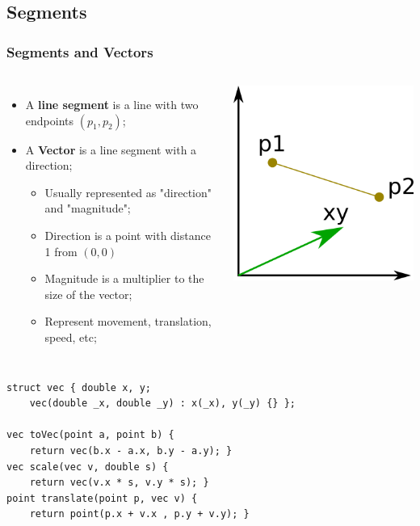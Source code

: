 \subsection{Segments}
\begin{frame}[fragile]
  \frametitle{Segments and Vectors}
    \begin{columns}
      \begin{itemize}
        \item A {\bf line segment} is a line with two endpoints $(p_1, p_2)$;
        \item A {\bf Vector} is a line segment with a direction;
        \begin{itemize}
          \item Usually represented as "direction" and "magnitude";
          \item Direction is a point with distance 1 from $(0,0)$
          \item Magnitude is a multiplier to the size of the vector;
          \item Represent movement, translation, speed, etc;
        \end{itemize}
      \end{itemize}
      \includegraphics[width=.9\textwidth]{../img/geom4}
    \end{columns}

{\smaller
    \begin{exampleblock}{}
\begin{verbatim}
struct vec { double x, y;
    vec(double _x, double _y) : x(_x), y(_y) {} };

vec toVec(point a, point b) {
    return vec(b.x - a.x, b.y - a.y); }
vec scale(vec v, double s) {
    return vec(v.x * s, v.y * s); }
point translate(point p, vec v) {
    return point(p.x + v.x , p.y + v.y); }
\end{verbatim}
    \end{exampleblock}
  }
\end{frame}

